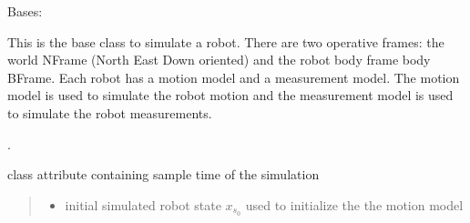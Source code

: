 \documentclass[letterpaper,10pt,english]{sphinxmanual}
\begin{document}
\begin{fulllineitems}
\label{\detokenize{robot_simulation:SimulatedRobot.SimulatedRobot}}
\pysigstartsignatures
{}
\pysigstopsignatures
\sphinxAtStartPar
Bases: 

\sphinxAtStartPar
This is the base class to simulate a robot. There are two operative frames: the world  N\sphinxhyphen{}Frame (North East Down oriented) and the robot body frame body B\sphinxhyphen{}Frame.
Each robot has a motion model and a measurement model. The motion model is used to simulate the robot motion and the measurement model is used to simulate the robot measurements.

\sphinxAtStartPar
{} .

\begin{fulllineitems}
\label{\detokenize{robot_simulation:SimulatedRobot.SimulatedRobot.dt}}
\pysigstartsignatures
{}
\pysigstopsignatures
\sphinxAtStartPar
class attribute containing sample time of the simulation

\end{fulllineitems}


\begin{fulllineitems}
\label{\detokenize{robot_simulation:SimulatedRobot.SimulatedRobot.__init__}}
\pysigstartsignatures
{}
\pysigstopsignatures\begin{quote}\begin{description}
\begin{itemize}
\item {} 
\sphinxAtStartPar
{} \textendash{} initial simulated robot state \(x_{s_0}\) used to initialize the the motion model


\end{itemize}
\end{description}
\end{quote}
\end{fulllineitems}
\end{fulllineitems}
\end{document}

